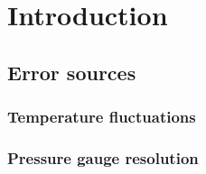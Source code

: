 \documentclass[11pt, rgb]{scrreprt}
\begin{document}
\listoftables
{}




%
%
%
%



\normalsize

\newpage

\chapter{Introduction}

    \section{Error sources}

        \subsection{Temperature fluctuations}


        \subsection{Pressure gauge resolution}
\end{document}
